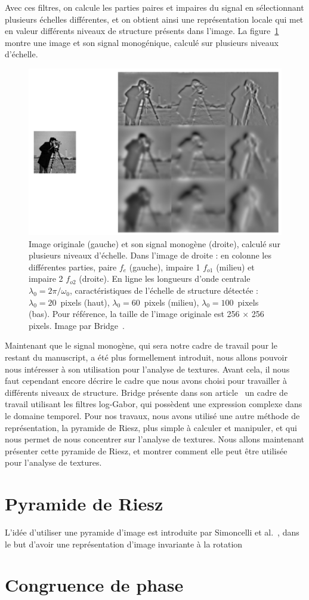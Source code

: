 Avec ces filtres, on calcule les parties paires et impaires du signal en sélectionnant plusieurs échelles différentes, et on obtient ainsi une représentation locale qui met en valeur différents niveaux de structure présents dans l'image. La figure~\ref{fig:cameraman-monogenic} montre une image et son signal monogénique, calculé sur plusieurs niveaux d'échelle.

\begin{figure}
    \centering
    \includegraphics[width=.75\textwidth]{resources/images/cameraman_monogenic}
    \caption[Signal monogène calculé pour plusieurs niveaux d'échelle]{Image originale (gauche) et son signal monogène (droite), calculé sur plusieurs niveaux d'échelle. Dans l'image de droite : en colonne les différentes parties, paire $f_e$ (gauche), impaire 1 $f_{o1}$ (milieu) et impaire 2 $f_{o2}$ (droite). En ligne les longueurs d'onde centrale $\lambda_0 = 2\pi/\omega_0$, caractéristiques de l'échelle de structure détectée : $\lambda_0 = 20$~pixels (haut), $\lambda_0 = 60$~pixels (milieu), $\lambda_0 = 100$~pixels (bas). Pour référence, la taille de l'image originale est 256 $\times$ 256 pixels. Image par Bridge~\cite{bridge_introduction_2018}.}
    \label{fig:cameraman-monogenic}
\end{figure}

\bigskip

Maintenant que le signal monogène, qui sera notre cadre de travail pour le restant du manuscript, a été plus formellement introduit, nous allons pouvoir nous intéresser à son utilisation pour l'analyse de textures. Avant cela, il nous faut cependant encore décrire le cadre que nous avons choisi pour travailler à différents niveaux de structure. Bridge présente dans son article~\cite{bridge_introduction_2018} un cadre de travail utilisant les filtres log-Gabor, qui possèdent une expression complexe dans le domaine temporel. Pour nos travaux, nous avons utilisé une autre méthode de représentation, la pyramide de Riesz, plus simple à calculer et manipuler, et qui nous permet de nous concentrer sur l'analyse de textures. Nous allons maintenant présenter cette pyramide de Riesz, et montrer comment elle peut être utilisée pour l'analyse de textures.

\section{Pyramide de Riesz}

L'idée d'utiliser une pyramide d'image est introduite par Simoncelli et al.~\cite{simoncelli_shiftable_1992}, dans le but d'avoir une représentation d'image invariante à la rotation


\section{Congruence de phase}